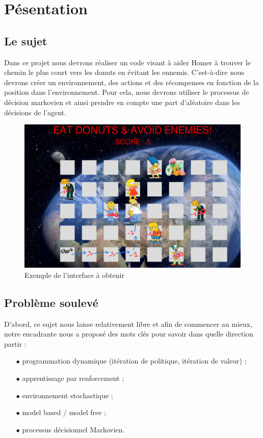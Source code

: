 \section{Pésentation}
\vspace{0.6cm}

\subsection{Le sujet}
Dans ce projet nous devrons réaliser un code visant à aider Homer à trouver le chemin le plus court vers les donuts en
évitant les ennemis. C'est-à-dire nous devrons créer un environnement, des actions et des récompenses en fonction de la position dans l'environnement. Pour cela, nous devrons utiliser le processus de décision markovien et ainsi prendre en compte une part d'aléatoire dans les décisions de l'agent.
\vspace{0.6cm}

\FloatBarrier %
\begin{figure}[!h]
\centering
\includegraphics[width=14cm,scale=1]{Capture2.PNG}
\caption{Exemple de l'interface à obtenir}
\end{figure}
\FloatBarrier


\subsection{Problème soulevé}

D'abord, ce sujet nous laisse relativement libre et afin de commencer au mieux, notre encadrante nous a proposé des mots clés pour savoir dans quelle direction partir : 
\begin{itemize}
  \item[$\bullet$] programmation dynamique (itération de politique, itération de valeur) ;
  \item[$\bullet$] apprentissage par renforcement ; 
  \item[$\bullet$] environnement stochastique ;
  \item[$\bullet$] model based / model free ; 
  \item[$\bullet$] processus décisionnel Markovien.
\end{itemize}


